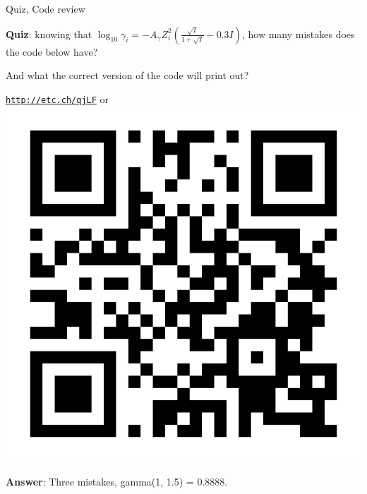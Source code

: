 \begin{frame}{Quiz, Code review}
   
\alert{\bf Quiz}: knowing that 
%
$\log_{10}\gamma_{i}=-A_{\gamma}Z_{i}^{2}\left(\tfrac{\sqrt{I}}{1+\sqrt{I}}-0.3I\right)$,
%
%
how many mistakes does the code below have?
%

%
And what the correct version of the code will print out?

\begin{center}
\href{http://etc.ch/qjLF}{\textcolor{indigo(dye)}{\tt http://etc.ch/qjLF}} \quad or \quad 
\includegraphics[height=0.12\columnwidth]{figures/activity-models/poll-ionic-strength.png}
\end{center}

\hiddenpause
\textbf{Answer}: Three mistakes, gamma(1, 1.5) = 0.8888.

\end{frame}
%
